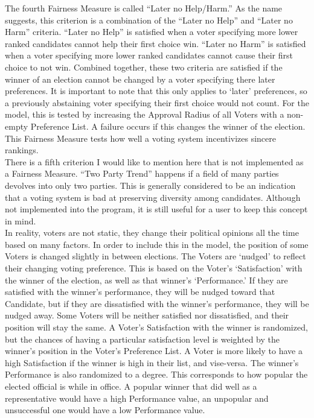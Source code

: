 \documentclass[12pt]{article}
\begin{document}
\qquad The fourth Fairness Measure is called ``Later no Help/Harm.'' As the name suggests, this criterion is a combination of the ``Later no Help'' and ``Later no Harm'' criteria. ``Later no Help'' is satisfied when a voter specifying more lower ranked candidates cannot help their first choice win. ``Later no Harm'' is satisfied when a voter specifying more lower ranked candidates cannot cause their first choice to not win. Combined together, these two criteria are satisfied if the winner of an election cannot be changed by a voter specifying there later preferences. It is important to note that this only applies to `later' preferences, so a previously abstaining voter specifying their first choice would not count. For the model, this is tested by increasing the Approval Radius of all Voters with a non-empty Preference List. A failure occurs if this changes the winner of the election. This Fairness Measure tests how well a voting system incentivizes sincere rankings. \\ 

\qquad There is a fifth criterion I would like to mention here that is not implemented as a Fairness Measure. ``Two Party Trend'' happens if a field of many parties devolves into only two parties. This is generally considered to be an indication that a voting system is bad at preserving diversity among candidates. Although not implemented into the program, it is still useful for a user to keep this concept in mind. \\

\qquad In reality, voters are not static, they change their political opinions all the time based on many factors. In order to include this in the model, the position of some Voters is changed slightly in between elections. The Voters are `nudged' to reflect their changing voting preference. This is based on the Voter's `Satisfaction' with the winner of the election, as well as that winner's `Performance.' If they are satisfied with the winner's performance, they will be nudged toward that Candidate, but if they are dissatisfied with the winner's performance, they will be nudged away. Some Voters will be neither satisfied nor dissatisfied, and their position will stay the same. A Voter's Satisfaction with the winner is randomized, but the chances of having a particular satisfaction level is weighted by the winner's position in the Voter's Preference List. A Voter is more likely to have a high Satisfaction if the winner is high in their list, and vise-versa. The winner's Performance is also randomized to a degree. This corresponds to how popular the elected official is while in office. A popular winner that did well as a representative would have a high Performance value, an unpopular and unsuccessful one would have a low Performance value. \\
\end{document}
